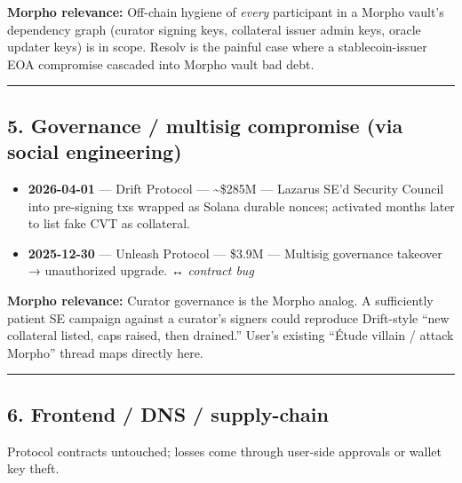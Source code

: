 \textbf{Morpho relevance:} Off-chain hygiene of \emph{every} participant in a Morpho vault's dependency graph (curator signing keys, collateral issuer admin keys, oracle updater keys) is in scope. Resolv is the painful case where a stablecoin-issuer EOA compromise cascaded into Morpho vault bad debt.

\begin{center}\rule{0.5\linewidth}{0.5pt}\end{center}

\subsection{5. Governance / multisig compromise (via social engineering)}\label{governance-multisig-compromise-via-social-engineering}

\begin{itemize}
\tightlist
\item
  \textbf{2026-04-01} --- Drift Protocol --- \textasciitilde\$285M --- Lazarus SE'd Security Council into pre-signing txs wrapped as Solana durable nonces; activated months later to list fake CVT as collateral.
\item
  \textbf{2025-12-30} --- Unleash Protocol --- \$3.9M --- Multisig governance takeover → unauthorized upgrade. ↔ \emph{contract bug}
\end{itemize}

\textbf{Morpho relevance:} Curator governance is the Morpho analog. A sufficiently patient SE campaign against a curator's signers could reproduce Drift-style ``new collateral listed, caps raised, then drained.'' User's existing ``Étude villain / attack Morpho'' thread maps directly here.

\begin{center}\rule{0.5\linewidth}{0.5pt}\end{center}

\subsection{6. Frontend / DNS / supply-chain}\label{frontend-dns-supply-chain}

Protocol contracts untouched; losses come through user-side approvals or wallet key theft.

